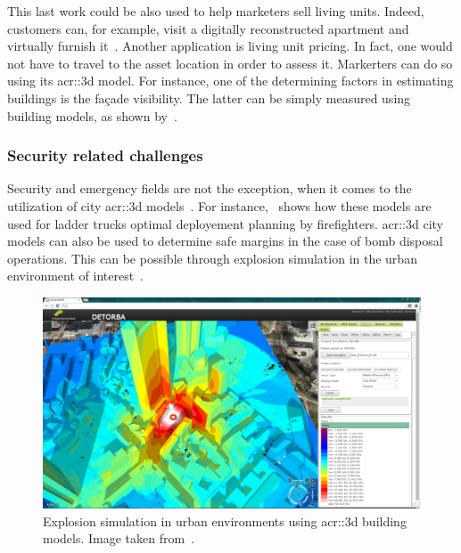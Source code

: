             This last work could be also used to help marketers sell living units.
            Indeed, customers can, for example, visit a digitally reconstructed apartment and virtually furnish it~\parencite{kim2019planar}.
            Another application is living unit pricing.
            In fact, one would not have to travel to the asset location in order to assess it.
            Markerters can do so using its \gls{acr::3d} model.
            For instance, one of the determining factors in estimating buildings is the fa\c{c}ade visibility.
            The latter can be simply measured using building models, as shown by~\textcite{albrecht2013assessing}.

        \subsubsection{Security related challenges}
            Security and emergency fields are not the exception, when it comes to the utilization of city \gls{acr::3d} models~\parencite{kwan2005emergency, ruppel2011designing}.
            For instance,~\textcite{chen2014application} shows how these models are used for ladder trucks optimal deployement planning by firefighters.
            \gls{acr::3d} city models can also be used to determine safe margins in the case of bomb disposal operations.
            This can be possible through explosion simulation in the urban environment of interest~\parencite{willenborg2015simulation}.\\
            \begin{figure}[htpb]
                \centering
                \includegraphics[width=\textwidth]{images/introduction/3d_model_applications/explosion_simulation}            
                \caption[
                    Explosion simulation in urban environments using \acrshort*{acr::3d} building models.
                ]{
                    \label{fig::explosion_simulation}
                    Explosion simulation in urban environments using \gls{acr::3d} building models.
                    Image taken from~\parencite{biljecki2015applications}.
                }
            \end{figure}
